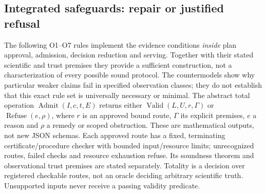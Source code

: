 \subsection{Integrated safeguards: repair or justified refusal}
\label{sec:admission}
The following O1--O7 rules implement the evidence conditions \emph{inside}
plan approval, admission, decision reduction and serving. Together with their
stated scientific and trust premises they provide a sufficient construction,
not a characterization of every possible sound protocol. The countermodels
show why particular weaker claims fail in specified observation classes;
they do not establish that this exact rule set is universally necessary or
minimal. The abstract total operation $\operatorname{Admit}(I,c,t,E)$
returns either $\operatorname{Valid}(L,U,r,\Gamma)$ or
$\operatorname{Refuse}(e,\rho)$, where $r$ is an approved bound route,
$\Gamma$ its explicit premises, $e$ a
reason and $\rho$ a remedy or scoped obstruction. These are mathematical
outputs, not new JSON schemas. Each approved route has a fixed, terminating
certificate/procedure checker with bounded input/resource limits; unrecognized
routes, failed checks and resource exhaustion refuse. Its soundness theorem
and observational trust premises are stated separately. Totality is a
decision over registered checkable routes, not an oracle deciding arbitrary
scientific truth. Unsupported inputs never receive a passing validity predicate.

